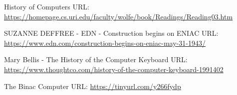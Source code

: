 \documentclass{article}
\begin{document}
 \newpage
 \begin{thebibliography}{00}
    
 History of Computers
\newline
URL: \url{https://homepage.cs.uri.edu/faculty/wolfe/book/Readings/Reading03.htm}

 SUZANNE DEFFREE - EDN - Construction begins on ENIAC
\newline
URL: \url{https://www.edn.com/construction-begins-on-eniac-may-31-1943/}

 Mary Bellis - The History of the Computer Keyboard
\newline
URL: \url{https://www.thoughtco.com/history-of-the-computer-keyboard-1991402}

 The Binac Computer
\newline
URL: \url{https://tinyurl.com/y266fydp}

\end{thebibliography}

\end{document}
